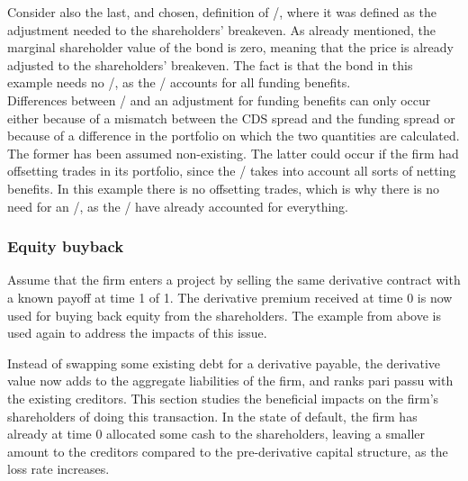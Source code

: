 \documentclass[../main.tex]{subfiles}
\begin{document}
            Consider also the last, and chosen, definition of \FVA/,
            where it was defined as the adjustment needed to the shareholders' breakeven.
            As already mentioned, the marginal shareholder value of the bond is zero,
            meaning that the price is already adjusted to the shareholders' breakeven.
            The fact is that the bond in this example needs no \FVA/,
            as the \DVA/ accounts for all funding benefits.
            \\
            Differences between \DVA/ and an adjustment for funding benefits can only occur 
            either because of a mismatch between the CDS spread and the funding spread
            or because of a difference in the portfolio on which the two quantities are calculated. 
            The former has been assumed non-existing.
            The latter could occur if the firm had offsetting trades in its portfolio,
            since the \FVA/ takes into account all sorts of netting benefits.
            In this example there is no offsetting trades, 
            which is why there is no need for an \FVA/, as the \DVA/ have already accounted for everything.

        \subsubsection{Equity buyback}
            Assume that the firm enters a project 
            by selling the same derivative contract with a known payoff at time 1 of 1. 
            The derivative premium received at time 0 is now used for buying back equity from the shareholders. 
            The example from above is used again to address the impacts of this issue.

            Instead of swapping some existing debt for a derivative payable, 
            the derivative value now adds to the aggregate liabilities of the firm, 
            and ranks pari passu with the existing creditors.
            This section studies the beneficial impacts on the firm's shareholders of doing this transaction.
            In the state of default, the firm has already at time 0 allocated some cash to the shareholders, 
            leaving a smaller amount to the creditors compared to the pre-derivative capital structure, 
            as the loss rate increases.
\end{document}
